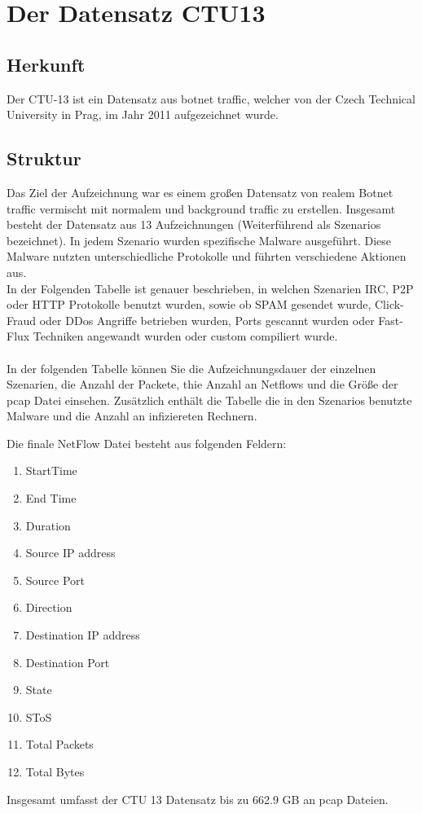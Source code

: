 \documentclass[main.tex]{subfiles}
\begin{document}
\section{Der Datensatz CTU13}
\subsection{Herkunft}
Der CTU-13 ist ein Datensatz aus botnet traffic, welcher von der Czech Technical University in Prag, im Jahr 2011 aufgezeichnet wurde. 
\subsection{Struktur}
Das Ziel der Aufzeichnung war es einem großen Datensatz von realem Botnet traffic vermischt mit normalem und background traffic zu erstellen. Insgesamt besteht der Datensatz aus 13 Aufzeichnungen (Weiterführend als Szenarios bezeichnet). In jedem Szenario wurden spezifische Malware ausgeführt. Diese Malware nutzten unterschiedliche Protokolle und führten verschiedene Aktionen aus.  \\
 In der Folgenden Tabelle ist genauer beschrieben, in welchen Szenarien IRC, P2P oder HTTP Protokolle benutzt wurden, sowie ob SPAM gesendet wurde, Click-Fraud oder DDos Angriffe betrieben wurden, Ports gescannt wurden oder Fast-Flux Techniken angewandt wurden oder custom compiliert wurde.\\
\\
In der folgenden Tabelle können Sie die Aufzeichnungsdauer der einzelnen Szenarien, die Anzahl der Packete, thie Anzahl an Netflows und die Größe der pcap Datei einsehen. Zusätzlich enthält die Tabelle die in den Szenarios benutzte Malware und die Anzahl an infiziereten Rechnern.  

Die finale NetFlow Datei besteht aus folgenden Feldern:
\begin{center}
\begin{enumerate}
\item StartTime
\item End Time
\item Duration
\item Source IP address
\item Source Port
\item Direction
\item Destination IP address
\item Destination Port
\item State
\item SToS
\item Total Packets
\item Total Bytes
\end{enumerate}
\end{center}
Insgesamt umfasst der CTU 13 Datensatz bis zu 662.9 GB an pcap Dateien.  \\
\end{document}
